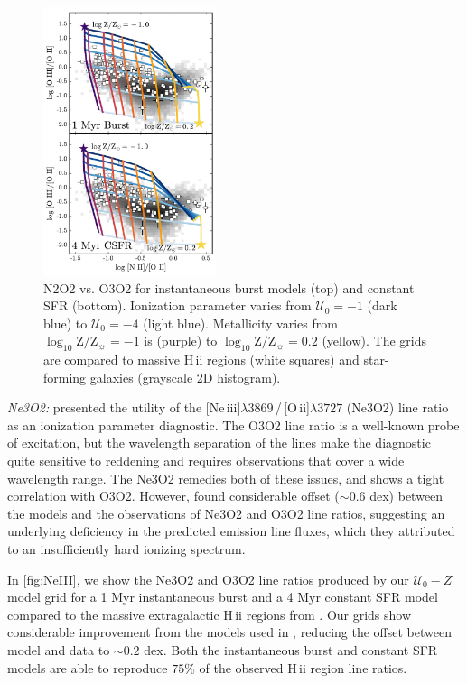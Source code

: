 \documentclass[trackchanges, twocolumn, tighten]{aastex61}
\newcommand{\Fig}[1]{\autoref{fig:#1}}
\newcommand{\logten}{\ensuremath{\log_{10}}}
\newcommand{\oii}{[O\,{\sc ii}]\xspace}
\newcommand{\neiii}{[Ne\,{\sc iii}]\xspace}
\newcommand{\hii}{H\,{\sc ii}\xspace}
\newcommand\lam[1]{\ensuremath{\lambda #1}}
\newcommand{\logZeq}[1]{\ensuremath{\logten \mathrm{Z}/\mathrm{Z}_{\sun} = #1}}
\newcommand{\U}{\ensuremath{\mathcal{U}_{0}}}
\begin{document}
\begin{figure}
  \begin{centering}
    \includegraphics[width=0.45\textwidth]{f18.pdf}
    \caption{N2O2 vs. O3O2 for instantaneous burst models (top) and constant SFR (bottom). Ionization parameter varies from $\U=-1$ (dark blue) to $\U=-4$ (light blue). Metallicity varies from \logZeq{-1} is (purple) to \logZeq{0.2} (yellow). The grids are compared to massive \hii regions (white squares) and star-forming galaxies (grayscale 2D histogram).}
    \label{fig:NIIOII}
  \end{centering}
\end{figure}

{\it Ne3O2:} \citet{Levesque14} presented the utility of the \neiii\lam{3869}\,/\,\oii\lam{3727} (Ne3O2) line ratio as an ionization parameter diagnostic. The O3O2 line ratio is a well-known probe of excitation, but the wavelength separation of the lines make the diagnostic quite sensitive to reddening and requires observations that cover a wide wavelength range. The Ne3O2 remedies both of these issues, and shows a tight correlation with O3O2. However, \citet{Levesque14} found considerable offset (${\sim}0.6$ dex) between the models and the observations of Ne3O2 and O3O2 line ratios, suggesting an underlying deficiency in the predicted emission line fluxes, which they attributed to an insufficiently hard ionizing spectrum. 

In \Fig{NeIII}, we show the Ne3O2 and O3O2 line ratios produced by our $\U-Z$ model grid for a 1 Myr instantaneous burst and a 4 Myr constant SFR model compared to the massive extragalactic \hii regions from \citet{vanzee98}. Our grids show considerable improvement from the models used in \citet{Levesque14}, reducing the offset between model and data to $\sim 0.2$ dex. Both the instantaneous burst and constant SFR models are able to reproduce $75\%$ of the observed \hii region line ratios.
\end{document}

